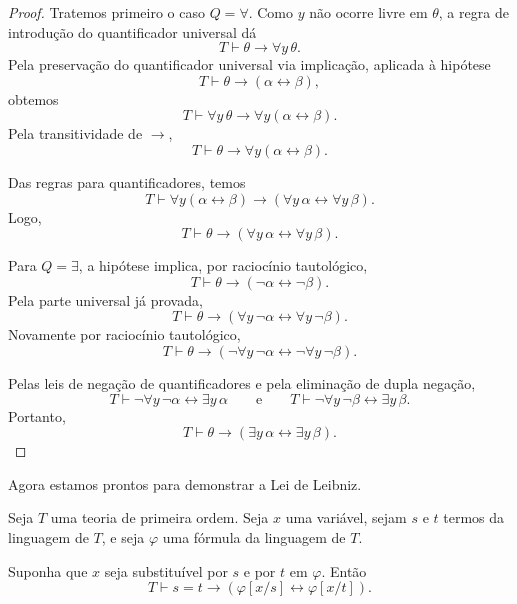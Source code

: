 \begin{proof}
    Tratemos primeiro o caso $Q=\forall$.
    Como $y$ não ocorre livre em $\theta$, a regra de introdução do quantificador universal dá
    \[
        T\vdash \theta\rightarrow\forall y\,\theta.
    \]
    Pela preservação do quantificador universal via implicação, aplicada à hipótese
    \[
        T\vdash \theta\rightarrow(\alpha\leftrightarrow\beta),
    \]
    obtemos
    \[
        T\vdash
        \forall y\,\theta\rightarrow \forall y(\alpha\leftrightarrow\beta).
    \]
    Pela transitividade de $\rightarrow$,
    \[
        T\vdash \theta\rightarrow \forall y(\alpha\leftrightarrow\beta).
    \]

    Das regras para quantificadores, temos
    \[
        T\vdash
        \forall y(\alpha\leftrightarrow\beta)
        \rightarrow
        (\forall y\,\alpha\leftrightarrow\forall y\,\beta).
    \]
    Logo,
    \[
        T\vdash \theta\rightarrow(\forall y\,\alpha\leftrightarrow\forall y\,\beta).
    \]

    Para $Q=\exists$, a hipótese implica, por raciocínio tautológico,
    \[
        T\vdash \theta\rightarrow(\neg\alpha\leftrightarrow\neg\beta).
    \]
    Pela parte universal já provada,
    \[
        T\vdash
        \theta\rightarrow(\forall y\,\neg\alpha\leftrightarrow \forall y\,\neg\beta).
    \]
    Novamente por raciocínio tautológico,
    \[
        T\vdash
        \theta\rightarrow(\neg\forall y\,\neg\alpha\leftrightarrow \neg\forall y\,\neg\beta).
    \]

    Pelas leis de negação de quantificadores e pela eliminação de dupla negação,
    \[
        T\vdash \neg\forall y\,\neg\alpha\leftrightarrow \exists y\,\alpha
        \qquad\text{e}\qquad
        T\vdash \neg\forall y\,\neg\beta\leftrightarrow \exists y\,\beta.
    \]
    Portanto,
    \[
        T\vdash \theta\rightarrow(\exists y\,\alpha\leftrightarrow \exists y\,\beta).
    \]
\end{proof}

Agora estamos prontos para demonstrar a Lei de Leibniz.

\begin{metatheorem}\label{mthm:leiIgualdadeLeibniz}
    Seja $T$ uma teoria de primeira ordem.
    Seja $x$ uma variável, sejam $s$ e $t$ termos da linguagem de $T$, e seja $\varphi$ uma fórmula da linguagem de $T$.

    Suponha que $x$ seja substituível por $s$ e por $t$ em $\varphi$.
    Então
    \[
        T\vdash s=t\rightarrow(\varphi[x/s]\leftrightarrow\varphi[x/t]).
    \]
\end{metatheorem}

